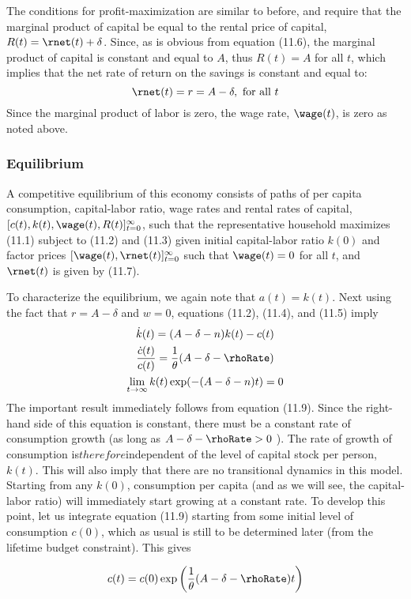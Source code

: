 \documentclass[\topdir/lecture\_notes.tex]{subfiles}
\begin{document}
The conditions for profit-maximization are similar to before, and require that the marginal product of capital be equal to the rental price of capital, $R(t)=\rnet(t)+\delta$. Since, as is obvious from equation (11.6), the marginal product of capital is constant and equal to $A$, thus $R(t)=A$ for all $t$, which implies that the net rate of return on the savings is constant and equal to:
\[
\rnet(t)=r=A-\delta, \text{ for all } t
\]
Since the marginal product of labor is zero, the wage rate, $\wage(t)$, is zero as noted above.

\subsubsection{Equilibrium}
A competitive equilibrium of this economy consists of paths of per capita consumption, capital-labor ratio, wage rates and rental rates of capital, $[c(t), k(t), \wage(t), R(t)]_{t=0}^{\infty}$, such that the representative household maximizes (11.1) subject to (11.2) and (11.3) given initial capital-labor ratio $k(0)$ and factor prices $[\wage(t), \rnet(t)]_{t=0}^{\infty}$ such that $\wage(t)=0$ for all $t$, and $\rnet(t)$ is given by (11.7).

To characterize the equilibrium, we again note that $a(t)=k(t)$. Next using the fact that $r=A-\delta$ and $w=0$, equations (11.2), (11.4), and (11.5) imply
\[
\begin{gathered}
\dot{k}(t)=(A-\delta-n) k(t)-c(t) \\
\frac{\dot{c}(t)}{c(t)}=\frac{1}{\theta}(A-\delta-\rhoRate) \\
\lim _{t \rightarrow \infty} k(t) \exp (-(A-\delta-n) t)=0
\end{gathered}
\]
The important result immediately follows from equation (11.9). Since the right-hand side of this equation is constant, there must be a constant rate of consumption growth (as long as $A-\delta-\rhoRate > 0$ ). The rate of growth of consumption is$ therefore $independent of the level of capital stock per person, $k(t)$. This will also imply that there are no transitional dynamics in this model. Starting from any $k(0)$, consumption per capita (and as we will see, the capital-labor ratio) will immediately start growing at a constant rate. To develop this point, let us integrate equation (11.9) starting from some initial level of consumption $c(0)$, which as usual is still to be determined later (from the lifetime budget constraint). This gives

\[
c(t)=c(0) \exp \left(\frac{1}{\theta}(A-\delta-\rhoRate) t\right)
\]
\end{document}
